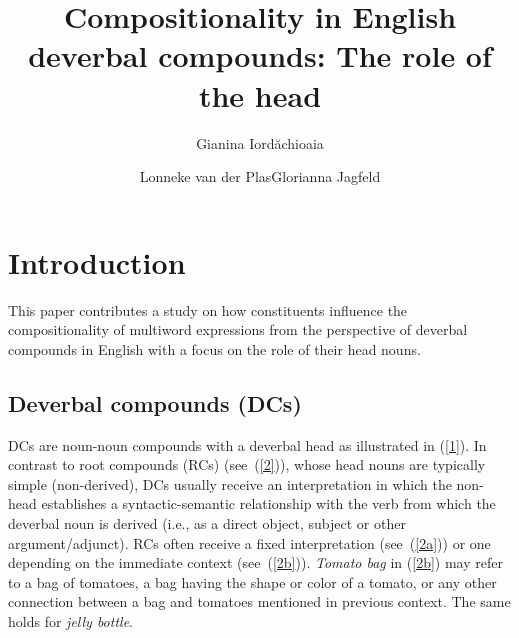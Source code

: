 \documentclass[output=paper]{langsci/langscibook}
\title{Compositionality in English deverbal compounds: The role of the head}
\author{Gianina Iordăchioaia\affiliation{University of Stuttgart}\and Lonneke van der Plas\affiliation{University of Malta}\lastand Glorianna Jagfeld\affiliation{Lancaster University}}
\begin{document}
\maketitle

\section{Introduction}\label{sec:intro} 

This paper contributes a study on how constituents influence the compositionality of multiword expressions from the perspective of deverbal compounds in English with a focus on the role of their head nouns. 

\subsection{Deverbal compounds (DCs)}\label{sec:intro:DCs}
DCs are noun-noun compounds with a deverbal head as illustrated in (\ref{1}). In contrast to root compounds (RCs) (see~(\ref{2})), whose head nouns are typically simple (non-derived), DCs usually receive an interpretation in which the non-head establishes a syntactic-semantic relationship with the verb from which the deverbal noun is derived (i.e., as a direct object, subject or other argument/adjunct). RCs often receive a fixed interpretation (see~(\ref{2a})) or one depending on the immediate context (see~(\ref{2b})). \textit{Tomato bag} in (\ref{2b}) may refer to a bag of tomatoes, a bag having the shape or color of a tomato, or any other connection between a bag and tomatoes mentioned in previous context. The same holds for \textit{jelly bottle}.


\begin{exe}
\end{exe}

\begin{exe}
\end{exe}
\end{document}
